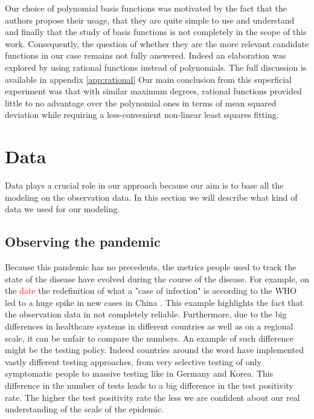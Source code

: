 \documentclass[12pt, letterpaper]{article}
\newcommand{\com}[1]{{\small {\fontfamily{ptm} \selectfont \textcolor{red}{#1}}}}
\begin{document}
Our choice of polynomial basis functions was motivated by the fact that the authors propose their usage, that they are quite simple to use and understand and finally that the study of basis functions is not completely in the scope of this work. 
Consequently, the question of whether they are the more relevant candidate functions in our case remains not fully answered. 
Indeed an elaboration was explored by using rational functions instead of polynomials. 
The full discussion is available in appendix \ref{app:rational}
Our main conclusion from this superficial experiment was that with similar maximum degrees, rational functions provided little to no advantage over the polynomial ones in terms of mean squared deviation while requiring a less-convenient non-linear least squares fitting.



\section{Data}

Data plays a crucial role in our approach because our aim is to base all the modeling on the observation data.
In this section we will describe what kind of data we used for our modeling.

\subsection{Observing the pandemic}\label{sec:jhu}

Because this pandemic has no precedents, the metrics people used to track the state of the disease have evolved during the course of the disease. 
For example, on the \com{date} the redefinition of what a "case of infection" is according to the WHO led to a huge spike in new cases in China \cite{}. 
This example highlights the fact that the observation data in not completely reliable. 
Furthermore, due to the big differences in healthcare systems in different countries as well as on a regional scale, it can be unfair to compare the numbers. 
An example of such difference might be the testing policy. 
Indeed countries around the word have implemented vastly different testing approaches, from very selective testing of only symptomatic people to massive testing like in Germany and Korea. This difference in the number of tests leads to a big difference in the test positivity rate. The higher the test positivity rate the less we are confident about our real understanding of the scale of the epidemic.
\end{document}
